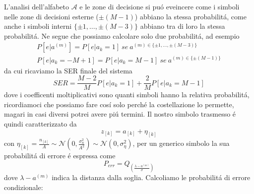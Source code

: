             L'analisi dell'alfabeto $\mathcal{A}$ e le zone di decisione si puó eveincere come i simboli 
            nelle zone di decisioni esterne ($\pm(M-1)$) abbiano la stessa probabilitá, come anche i 
            simboli interni $\{\pm 1,\dots,\pm (M-3)\}$ abbiano tra di loro la stessa probabilitá. Ne segue che 
            possiamo calcolare solo due probabilitá, ad esempio
            \begin{gather}
                P[e|a^{(m)}] = P[e|a_k = 1]\ se\ a^{(m)\in\{\pm 1,\dots,\pm (M-3)\}}\nonumber \\
                P[e|a_k =-M+1] = P[e|a_k = M-1]\ se\ a^{(m)\in\{\pm (M-1)\}}\nonumber
            \end{gather}
            da cui ricaviamo la SER finale del sistema
            \[
                SER =  \frac{M-2}{M}P[e|a_k = 1]+ \frac{2}{M}P[e|a_k = M-1]
            \]
            dove i coefficenti moltiplicativi sono quanti simboli hanno la relativa probabilitá, ricordiamoci
            che possiamo fare cosí solo perché la costellazione lo permette, magari in casi diversi potrei
            avere piú termini. Il nostro simbolo trasmesso é quindi caratterizzato da
            \[
                z_{[k]} = a_{[k]} + \eta_{[k]}
            \]
            con $\eta_{[k]} = \frac{n_{[k]}}{A} \sim \mathcal{N}(0,\frac{\sigma_n^2}{A^2})\sim \mathcal{N}(0,\sigma_\eta^2)$,
            per un generico simbolo la sua probabilitá di errore é espressa come 
            \[
                P_{err} = Q_{\displaystyle\left(\frac{\lambda - a^{(m)}}{\sigma}\right)}    
            \]
            dove $\lambda - a^{(m)}$ indica la distanza dalla soglia.
            Calcoliamo le probabilitá di errore condizionale:
